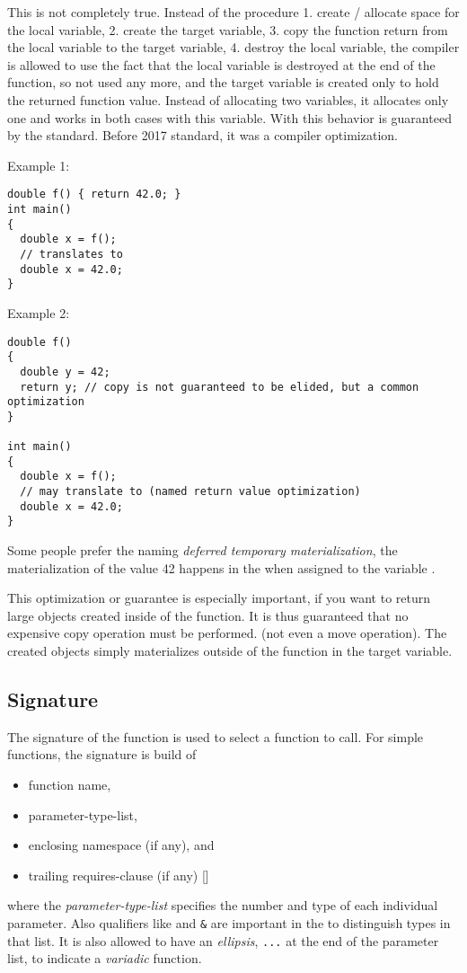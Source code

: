 This is not completely true. Instead of the procedure  1. create / allocate space for the local variable, 2. create the target variable,
3. copy the function return from the local variable to the target variable, 4. destroy the local variable, the compiler is allowed to use the
fact that the local variable is destroyed at the end of the function, so not used any more, and the target variable is created only to hold
the returned function value. Instead of allocating two variables, it allocates only one and works in both cases with this variable.
With \marginpar{[\cxx{17}]} this behavior is guaranteed by the standard. Before 2017 standard, it was a compiler optimization.

Example 1:
\begin{verbatim}
double f() { return 42.0; }
int main()
{
  double x = f();
  // translates to
  double x = 42.0;
}
\end{verbatim}

Example 2:
\begin{verbatim}
double f()
{
  double y = 42;
  return y; // copy is not guaranteed to be elided, but a common optimization
}

int main()
{
  double x = f();
  // may translate to (named return value optimization)
  double x = 42.0;
}
\end{verbatim}

Some people prefer the naming \emph{deferred temporary materialization}, \ie the materialization of the value 42 happens in the  when
assigned to the variable .

This optimization or guarantee is especially important, if you want to return large objects created inside of the function. It is thus
guaranteed that no expensive copy operation must be performed. (not even a move operation). The created objects simply materializes outside of
the function in the target variable.


\subsection{Signature\label{sec:function-signature}}
The signature of the function is used to select a function to call. For simple functions, the signature is build of
\begin{itemize}
  \item function name,
  \item parameter-type-list,
  \item enclosing namespace (if any), and
  \item trailing requires-clause (if any) []
\end{itemize}
where the \emph{parameter-type-list} specifies the number and type of each individual parameter. Also qualifiers like  and \texttt{\&}
are important in the to distinguish types in that list. It is also allowed to have an \emph{ellipsis}, \ie \texttt{...} at the end of the parameter
list, to indicate a \emph{variadic} function.

